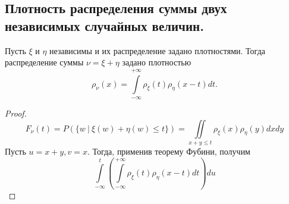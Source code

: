 \subsection{Плотность распределения суммы двух независимых случайных величин.}
\begin{theorem}
    Пусть $\xi$ и $\eta$ независимы и их распределение задано плотностями. Тогда распределение суммы $\nu = \xi + \eta$ задано плотностью 
    \[
        \rho_\nu(x) = \int \limits_{-\infty}^{+\infty} \rho_\xi(t) \rho_\eta(x - t) dt.
    \]
    \begin{proof}
        \[
            F_\nu(t) =
            P(\{ w \> | \> \xi(w) + \eta(w) \leqslant t \})
            = \iint \limits_{x + y \leqslant t} \rho_\xi(x) \rho_\eta(y) dxdy
        \]
        Пусть $u = x + y, v = x$. Тогда, применив теорему Фубини, получим
        \[
            \int \limits_{-\infty}^t \left(
                \int \limits_{-\infty}^{+\infty} \rho_\xi(t) \rho_\eta(x - t) dt
            \right) du
        \]
    \end{proof}
\end{theorem}